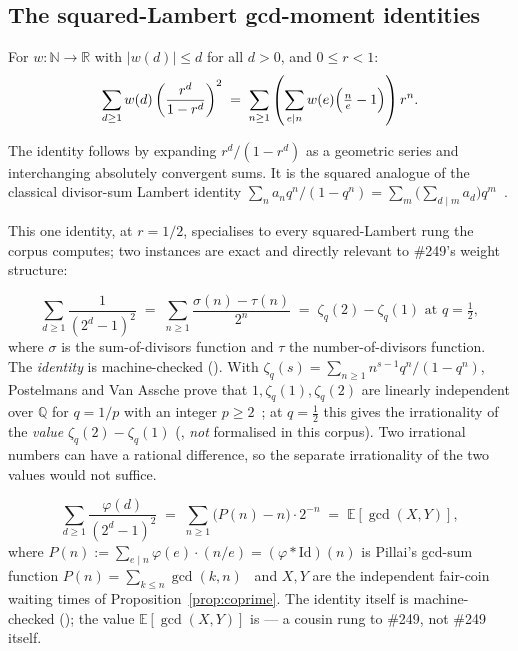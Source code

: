 \subsection{The squared-Lambert gcd-moment identities}
\label{ssec:lambert}

\begin{prop}
\label{prop:lambertengine}
For $w:\mathbb{N}\to\mathbb{R}$ with $|w(d)|\le d$ for all $d>0$, and $0\le r<1$:
\[
\sum_{d\ge1} w(d)\left(\frac{r^d}{1-r^d}\right)^2 \;=\; \sum_{n\ge1}\left(\sum_{e\mid n} w(e)\Bigl(\tfrac{n}{e}-1\Bigr)\right) r^n.
\]
  
\end{prop}

\noindent The identity follows by expanding $r^d/(1-r^d)$ as a geometric
series and interchanging absolutely convergent sums.  It is the squared
analogue of the classical divisor-sum Lambert identity
$\sum_na_nq^n/(1-q^n)=\sum_m\bigl(\sum_{d\mid m}a_d\bigr)q^m$~\cite[(1),
p.~2]{merca-schmidt}.

This one identity, at $r=1/2$, specialises to every squared-Lambert rung the
corpus computes; two instances are exact and directly relevant to \#249's
weight structure:

\begin{prop}
\label{prop:zetaq}
\[
\sum_{d\ge1} \frac{1}{(2^d-1)^2} \;=\; \sum_{n\ge1} \frac{\sigma(n)-\tau(n)}{2^n} \;=\; \zeta_q(2)-\zeta_q(1) \text{ at } q=\tfrac12,
\]
where $\sigma$ is the sum-of-divisors function and $\tau$ the number-of-divisors
function. The \emph{identity} is machine-checked ().  With
$\zeta_q(s)=\sum_{n\ge1}n^{s-1}q^n/(1-q^n)$, Postelmans and Van Assche prove
that $1,\zeta_q(1),\zeta_q(2)$ are linearly independent over $\mathbb{Q}$ for
$q=1/p$ with an integer $p\ge2$~\cite[Theorem~1.3, p.~3]{postelmans-vanassche};
at $q=\tfrac12$ this gives the irrationality of the \emph{value}
$\zeta_q(2)-\zeta_q(1)$ (, \emph{not} formalised in this corpus).
Two irrational numbers can have a rational difference, so the separate
irrationality of the two values would not suffice.
 
\end{prop}

\begin{prop}
\label{prop:pillai}
\[
\sum_{d\ge1} \frac{\varphi(d)}{(2^d-1)^2} \;=\; \sum_{n\ge1} \bigl(P(n)-n\bigr)\cdot 2^{-n} \;=\; \mathbb{E}[\gcd(X,Y)],
\]
where $P(n) := \sum_{e\mid n}\varphi(e)\cdot(n/e) = (\varphi * \mathrm{Id})(n)$
is Pillai's gcd-sum function $P(n)=\sum_{k\le n}\gcd(k,n)$~\cite[\S1,
(1)--(2)]{toth-gcd} and $X,Y$ are the independent fair-coin waiting
times of Proposition~\ref{prop:coprime}. The identity itself is
machine-checked (); the value $\mathbb{E}[\gcd(X,Y)]$ is  ---
a cousin rung to \#249, not \#249 itself.
 
\end{prop}

